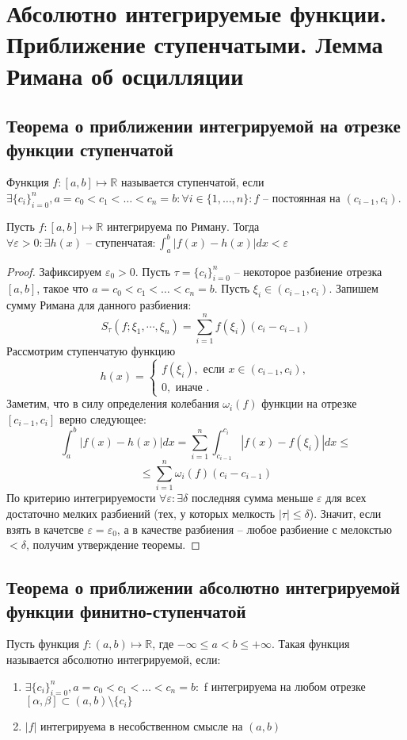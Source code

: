 \documentclass[document.tex]{subfiles}
\begin{document}
\section{Абсолютно интегрируемые функции. Приближение ступенчатыми. Лемма Римана об осцилляции}
\subsection{Теорема о приближении интегрируемой на отрезке функции ступенчатой}
\begin{definition}
Функция $f: [a, b] \mapsto \mathbb{R}$ называется ступенчатой, если $\exists \{c_i\}_{i=0}^n,
a = c_0 < c_1 < \ldots < c_n = b: \forall i \in \{1, \ldots, n\}: f\text{ -- постоянная на }(c_{i-1}, c_i)$.
\end{definition}

\begin{theorem}
Пусть $f : [a, b] \mapsto \mathbb{R}$ интегрируема по Риману. Тогда $\forall \varepsilon > 0: \exists h(x)\text{ -- ступенчатая} : \int_a^b|f(x)-h(x)|dx < \varepsilon$
\end{theorem}
\begin{proof}
    Зафиксируем $\varepsilon_0 > 0$.
Пусть $\tau = \{c_i\}_{i=0}^n$ -- некоторое разбиение отрезка $[a, b]$, такое что $a = c_0 < c_1 < \ldots < c_n = b$. Пусть $\xi_i \in (c_{i - 1}, c_i)$. Запишем сумму Римана для данного разбиения:
$$S_{\tau}(f; \xi_1, \cdots, \xi_n) = \sum_{i=1}^n f(\xi_i)(c_i - c_{i-1})$$
Рассмотрим ступенчатую функцию
 $$h(x) = \begin{cases}
 	f(\xi_i),\text{ если } x \in (c_{i-1}, c_i),\\
 	0, \text{ иначе }.
\end{cases}$$
Заметим, что в силу определения колебания $\omega_i(f)$ функции на отрезке $[c_{i - 1}, c_i]$ верно следующее:
$$\int_a^b|f(x)-h(x)|dx = \sum_{i=1}^n\int_{c_{i-1}}^{c_i}|f(x) - f(\xi_i)|dx \leq$$
$$\leq \sum_{i=1}^n\omega_i(f)(c_i - c_{i-1})$$
По критерию интегрируемости $\forall \varepsilon : \exists \delta$ последняя сумма меньше $\varepsilon$ для всех достаточно мелких
разбиений (тех, у которых мелкость $|\tau| \leq \delta$). Значит, если взять в качетсве $\varepsilon = \varepsilon_0$, а
в качестве разбиения -- любое разбиение с мелокстью $< \delta$, получим утверждение теоремы.
\end{proof}

\subsection{Теорема о приближении абсолютно интегрируемой функции финитно-ступенчатой}
\begin{definition}
Пусть функция $f: (a, b) \mapsto \mathbb{R}$, где $-\infty \leq a < b \leq +\infty$. Такая функция называется абсолютно интегрируемой, если:
\begin{enumerate}
\item $\exists \{c_i\}_{i=0}^n, a = c_0 < c_1 < \ldots < c_n = b:$ f интегрируема на любом отрезке $[\alpha, \beta] \subset (a, b) \setminus \{c_i\}$
\item $|f|$ интегрируема в несобственном смысле на $(a, b)$
\end{enumerate}
\end{definition}
\end{document}
